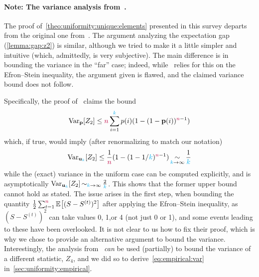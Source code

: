 \paragraph{Note: The variance analysis from~\citet{Paninski08}.}
	\label{note:paninski:flaw}
The proof of~\cref{theo:uniformity:unique:elements} presented in this survey departs from the original one from~\citet{Paninski08}. The argument analyzing the expectation gap (\cref{lemma:gap:z2}) is similar, although we tried to make it a little simpler and intuitive (which, admittedly, is very subjective). The main difference is in bounding the variance in the ``far'' case; indeed, while~\citep{Paninski08} relies for this on the Efron--Stein inequality, the argument given is flawed, and the claimed variance bound does not follow.

Specifically, the proof of~\citet[Lemma~2]{Paninski08} claims the bound
\[
  \operatorname{Var}_{\mathbf{p}}[Z_2] \leq {\textcolor{purple}{n}} \sum_{i=1}^{\textcolor{cyan}{k}} p(i)(1-(1-\mathbf{p}(i))^{{\textcolor{purple}{n}}-1})
\]
which, if true, would imply (after renormalizing to match our notation)
\[
  \operatorname{Var}_{\mathbf{u}_{\textcolor{cyan}{k}}}[Z_2] \leq \frac{1}{{\textcolor{purple}{n}}}(1-(1-1/{\textcolor{cyan}{k}})^{{\textcolor{purple}{n}}-1}) \operatorname*{\sim}_{{\textcolor{cyan}{k}}\to \infty} \frac{1}{{\textcolor{cyan}{k}}}
\]
while the (exact) variance in the uniform case can be computed explicitly, and is asymptotically $\operatorname{Var}_{\mathbf{u}_{\textcolor{cyan}{k}}}[Z_2] \operatorname*{\sim}_{{\textcolor{cyan}{k}}\to \infty} \frac{2}{{\textcolor{cyan}{k}}}$. 
This shows that the former upper bound cannot hold as stated. The issue arises in the first step, when bounding 
the quantity $\frac{1}{2} \sum_{t=1}^\ns \bEE{(S-S^{(t)})^2}$ after applying the Efron--Stein inequality, as $(S-S^{(t)})^2$ can take values 0, 1,or 4 (not just 0 or 1), and some events leading to these have been overlooked. It is not clear to us how to fix their proof, which is why we chose to provide an alternative argument to bound the variance. Interestingly, the analysis from~\citet[Lemma~2]{Paninski08} \emph{can} be used (partially) to bound the variance of a different statistic, $Z_4$, and we did so to derive~\cref{eq:empirical:var} in~\cref{sec:uniformity:empirical}.

